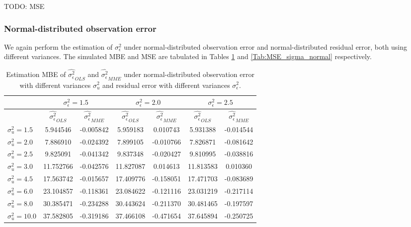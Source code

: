 \documentclass{article}
\begin{document}
TODO: MSE

\subsubsection{Normal-distributed observation error}

We again perform the estimation of $\sigma^2_\epsilon$ under normal-distributed observation error and normal-distributed residual error, both using different variances.
The simulated MBE and MSE are tabulated in Tables \ref{Tab:MBE_sigma_normal} and \ref{Tab:MSE_sigma_normal} respectively.

\begin{table}[ht]
    \centering
    \caption{Estimation MBE of $\hat{\sigma^2_\epsilon}_{OLS}$ and $\hat{\sigma^2_\epsilon}_{MME}$ under normal-distributed observation error with different variances $\sigma^2_u$ and residual error with different variances $\sigma^2_\epsilon$.}
    \label{Tab:MBE_sigma_normal}
    \begin{tabular}[t]{lcccccc}
        \hline
        &\multicolumn{2}{c}{$\sigma^2_\epsilon=1.5$}&\multicolumn{2}{c}{$\sigma^2_\epsilon=2.0$}&\multicolumn{2}{c}{$\sigma^2_\epsilon=2.5$}\\
        \hline
        &$\hat{\sigma^2_\epsilon}_{OLS}$&$\hat{\sigma^2_\epsilon}_{MME}$&$\hat{\sigma^2_\epsilon}_{OLS}$&
        $\hat{\sigma^2_\epsilon}_{MME}$&$\hat{\sigma^2_\epsilon}_{OLS}$&$\hat{\sigma^2_\epsilon}_{MME}$\\
        \hline
        $\sigma^2_u = 1.5$&5.944546&-0.005842&5.959183&0.010743&5.931388&-0.014544\\
        $\sigma^2_u = 2.0$&7.886910&-0.024392&7.899105&-0.010766&7.826871&-0.081642\\
        $\sigma^2_u = 2.5$&9.825091&-0.041342&9.837348&-0.020427&9.810995&-0.038816\\
        $\sigma^2_u = 3.0$&11.752766&-0.042576&11.827087&0.014613&11.813583&0.010360\\
        $\sigma^2_u = 4.5$&17.563742&-0.015657&17.409776&-0.158051&17.471703&-0.083689\\
        $\sigma^2_u = 6.0$&23.104857&-0.118361&23.084622&-0.121116&23.031219&-0.217114\\
        $\sigma^2_u = 8.0$&30.385471&-0.234288&30.443624&-0.211370&30.481465&-0.197597\\
        $\sigma^2_u = 10.0$&37.582805&-0.319186&37.466108&-0.471654&37.645894&-0.250725\\
        \hline
    \end{tabular}
\end{table}
\end{document}
